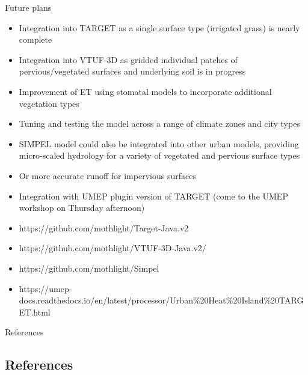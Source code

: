 \documentclass{beamer}
\begin{document}
\begin{frame}{Future plans} 

\begin{itemize}

\item Integration into TARGET as a single surface type (irrigated grass) is nearly complete

\item Integration into VTUF-3D as gridded individual patches of pervious/vegetated surfaces and underlying soil is in progress

\item Improvement of ET using stomatal models to incorporate additional vegetation types

\item Tuning and testing the model across a range of climate zones and city types

\item SIMPEL model could also be integrated into other urban models, providing micro-scaled hydrology for a variety of vegetated and pervious surface types

\item Or more accurate runoff for impervious surfaces

\item Integration with UMEP plugin version of TARGET (come to the UMEP workshop on Thursday afternoon)

\end{itemize}

\begin{itemize}
\setlength\itemsep{-0.55em}
\item[] {\tiny https://github.com/mothlight/Target-Java.v2}
\item[] {\tiny https://github.com/mothlight/VTUF-3D-Java.v2/} 
\item[] {\tiny https://github.com/mothlight/Simpel} 
\item[] {\tiny https://umep-docs.readthedocs.io/en/latest/processor/Urban\%20Heat\%20Island\%20TARGET.html}
\end{itemize}

\end{frame}




\begin{frame}[shrink=25]{References}
\begin{multicols}{2}
\section*{References}
%
%

\end{multicols}
\end{frame}
\end{document}
